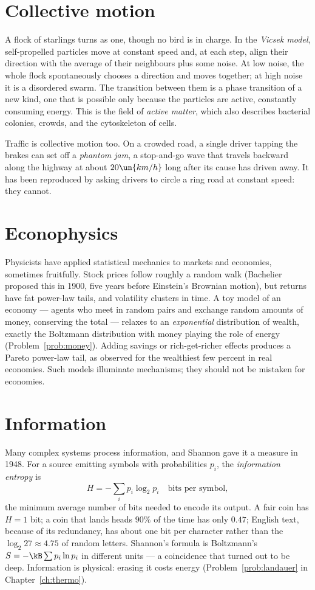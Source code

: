 \section{Collective motion}

A flock of starlings turns as one, though no bird is in charge. In the \emph{Vicsek model}, self-propelled particles move at constant speed and, at each step, align their direction with the average of their neighbours plus some noise. At low noise, the whole flock spontaneously chooses a direction and moves together; at high noise it is a disordered swarm. The transition between them is a phase transition of a new kind, one that is possible only because the particles are active, constantly consuming energy. This is the field of \emph{active matter}, which also describes bacterial colonies, crowds, and the cytoskeleton of cells.

Traffic is collective motion too. On a crowded road, a single driver tapping the brakes can set off a \emph{phantom jam}, a stop-and-go wave that travels backward along the highway at about $20\un{km/h}$ long after its cause has driven away. It has been reproduced by asking drivers to circle a ring road at constant speed: they cannot.

\section{Econophysics}

Physicists have applied statistical mechanics to markets and economies, sometimes fruitfully. Stock prices follow roughly a random walk (Bachelier proposed this in 1900, five years before Einstein's Brownian motion), but returns have fat power-law tails, and volatility clusters in time. A toy model of an economy --- agents who meet in random pairs and exchange random amounts of money, conserving the total --- relaxes to an \emph{exponential} distribution of wealth, exactly the Boltzmann distribution with money playing the role of energy (Problem~\ref{prob:money}). Adding savings or rich-get-richer effects produces a Pareto power-law tail, as observed for the wealthiest few percent in real economies. Such models illuminate mechanisms; they should not be mistaken for economies.

\section{Information}

Many complex systems process information, and Shannon gave it a measure in 1948. For a source emitting symbols with probabilities $p_i$, the \emph{information entropy} is
\[
  H = -\sum_i p_i\log_2p_i \quad\text{bits per symbol},
\]
the minimum average number of bits needed to encode its output. A fair coin has $H = 1$ bit; a coin that lands heads $90\%$ of the time has only $0.47$; English text, because of its redundancy, has about one bit per character rather than the $\log_2 27\approx4.75$ of random letters. Shannon's formula is Boltzmann's $S = -\kB\sum p_i\ln p_i$ in different units --- a coincidence that turned out to be deep. Information is physical: erasing it costs energy (Problem~\ref{prob:landauer} in Chapter~\ref{ch:thermo}).

